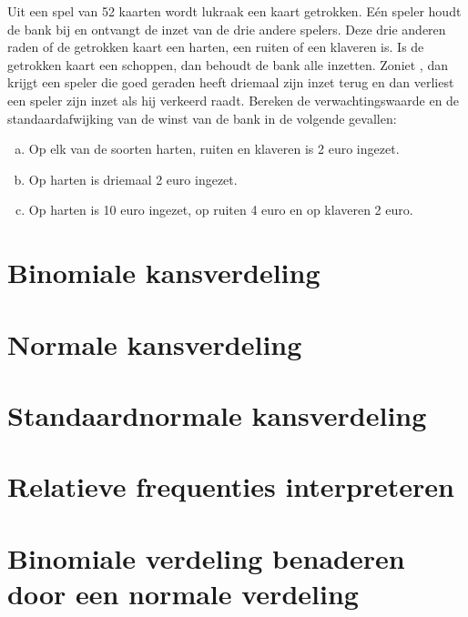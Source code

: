 \documentclass[12pt,twoside]{article}
\begin{document}
\begin{oefening}
Uit een spel van 52 kaarten wordt lukraak een kaart getrokken. Eén speler houdt de bank bij en ontvangt de inzet van de drie andere spelers. Deze drie anderen raden of de getrokken kaart een harten, een ruiten of een klaveren is. Is de getrokken kaart een schoppen, dan behoudt de bank alle inzetten. Zoniet , dan krijgt een speler die goed geraden heeft driemaal zijn inzet terug en dan verliest een speler zijn inzet als hij verkeerd raadt. Bereken de verwachtingswaarde en de standaardafwijking van de winst van de bank in de volgende gevallen:

\begin{enumerate}[(a)]
  \item Op elk van de soorten harten, ruiten en klaveren is 2 euro ingezet.
  \item Op harten is driemaal 2 euro ingezet.
  \item Op harten is 10 euro ingezet, op ruiten 4 euro en op klaveren 2 euro.
\end{enumerate}
\end{oefening}



\pagebreak
\section{Binomiale kansverdeling}

\section{Normale kansverdeling}

\section{Standaardnormale kansverdeling}

\section{Relatieve frequenties interpreteren}

\section{Binomiale verdeling benaderen door een normale verdeling}



\end{document}
